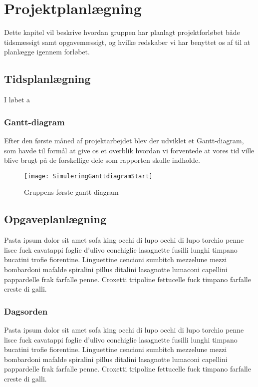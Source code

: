 \chapter{Projektplanlægning}
Dette kapitel vil beskrive hvordan gruppen har planlagt projektforløbet både tidsmæssigt samt opgavemæssigt, og hvilke redskaber vi har benyttet os af til at planlægge igennem forløbet.

\section{Tidsplanlægning}
I løbet a



\subsection{Gantt-diagram}
Efter den første måned af projektarbejdet blev der udviklet et Gantt-diagram, som havde til formål at give os et overblik hvordan vi forventede at vores tid ville blive brugt på de forskellige dele som rapporten skulle indholde.

\begin{figure}[h]
\texttt{[image: SimuleringGanttdiagramStart]}
\centering
\caption{Gruppens første gantt-diagram}\label{GanttDiagram}
\end{figure}

\section{Opgaveplanlægning}
Pasta ipsum dolor sit amet sofa king occhi di lupo occhi di lupo torchio penne lisce fuck cavatappi foglie d'ulivo conchiglie lasagnette fusilli lunghi timpano bucatini trofie fiorentine. Linguettine cencioni sumbitch mezzelune mezzi bombardoni mafalde spiralini pillus ditalini lasagnotte lumaconi capellini pappardelle frak farfalle penne. Croxetti tripoline fettucelle fuck timpano farfalle creste di galli.

\subsection{Dagsorden}
Pasta ipsum dolor sit amet sofa king occhi di lupo occhi di lupo torchio penne lisce fuck cavatappi foglie d'ulivo conchiglie lasagnette fusilli lunghi timpano bucatini trofie fiorentine. Linguettine cencioni sumbitch mezzelune mezzi bombardoni mafalde spiralini pillus ditalini lasagnotte lumaconi capellini pappardelle frak farfalle penne. Croxetti tripoline fettucelle fuck timpano farfalle creste di galli.

